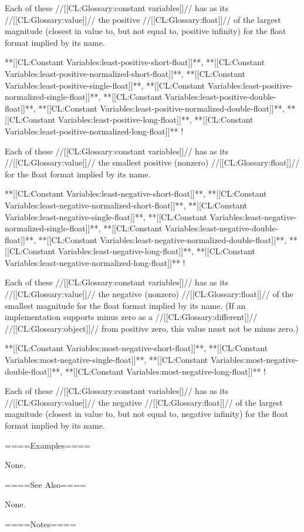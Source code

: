 Each of these //[[CL:Glossary:constant variables]]// has as its //[[CL:Glossary:value]]// the positive //[[CL:Glossary:float]]// of the largest magnitude (closest in value to, but not equal to, positive infinity) for the float format implied by its name.

\itemitem{\bull} **[[CL:Constant Variables:least-positive-short-float]]**, **[[CL:Constant Variables:least-positive-normalized-short-float]]**, **[[CL:Constant Variables:least-positive-single-float]]**, **[[CL:Constant Variables:least-positive-normalized-single-float]]**, **[[CL:Constant Variables:least-positive-double-float]]**, **[[CL:Constant Variables:least-positive-normalized-double-float]]**, **[[CL:Constant Variables:least-positive-long-float]]**, **[[CL:Constant Variables:least-positive-normalized-long-float]]** \Vskip 42pt!

Each of these //[[CL:Glossary:constant variables]]// has as its //[[CL:Glossary:value]]// the smallest positive (nonzero) //[[CL:Glossary:float]]// for the float format implied by its name.

\itemitem{\bull} **[[CL:Constant Variables:least-negative-short-float]]**, **[[CL:Constant Variables:least-negative-normalized-short-float]]**, **[[CL:Constant Variables:least-negative-single-float]]**, **[[CL:Constant Variables:least-negative-normalized-single-float]]**, **[[CL:Constant Variables:least-negative-double-float]]**, **[[CL:Constant Variables:least-negative-normalized-double-float]]**, **[[CL:Constant Variables:least-negative-long-float]]**, **[[CL:Constant Variables:least-negative-normalized-long-float]]** \Vskip 42pt!

Each of these //[[CL:Glossary:constant variables]]// has as its //[[CL:Glossary:value]]// the negative (nonzero) //[[CL:Glossary:float]]// of the smallest magnitude for the float format implied by its name. (If an implementation supports minus zero as a //[[CL:Glossary:different]]// //[[CL:Glossary:object]]// from positive zero, this value must not be minus zero.)

\itemitem{\bull} **[[CL:Constant Variables:most-negative-short-float]]**, **[[CL:Constant Variables:most-negative-single-float]]**, **[[CL:Constant Variables:most-negative-double-float]]**, **[[CL:Constant Variables:most-negative-long-float]]** \Vskip 18pt!

Each of these //[[CL:Glossary:constant variables]]// has as its //[[CL:Glossary:value]]// the negative //[[CL:Glossary:float]]// of the largest magnitude (closest in value to, but not equal to, negative infinity) for the float format implied by its name.

\endlist

====Examples====

None.

====See Also====

None.

====Notes====

